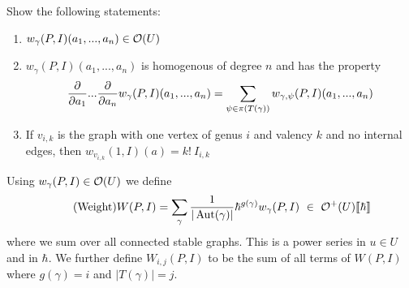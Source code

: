 \begin{ex}
Show the following statements:
\begin{enumerate}
  \item $w_\gamma(P,I)(a_1, ..., a_n) \in \mathcal{O}(U)$

  \item $w_\gamma(P,I)(a_1, ..., a_n)$ is homogenous of degree $n$ and has the property
  \begin{equation}\frac{\partial }{\partial a_1} ... \frac{\partial }{\partial a_n} w_\gamma(P,I)(a_1, ..., a_n) = \sum_{\psi \in \pi(T(\gamma))} w_{\gamma, \psi} (P,I) (a_1, ..., a_n)\end{equation}

  \item If $v_{i,k}$ is the graph with one vertex of genus $i$ and valency $k$ and no internal edges, then $w_{v_{i,k}}(1, I)(a) = k! \ I_{i,k}$
\end{enumerate}
\end{ex}

Using $w_\gamma (P,I) \in \mathcal{O}(U)$ we define
\begin{equation}\label{eq:WPI}\tag{Weight}
  W(P,I) = \sum_\gamma \frac{1}{|\operatorname{Aut}(\gamma)|} \hbar^{g(\gamma)} w_\gamma (P,I) \ \in \ \mathcal{O}^+(U)\llbracket \hbar \rrbracket
\end{equation}
where we sum over all connected stable graphs. This is a power series in $u \in U$ and in $\hbar$. We further define $W_{i,j}(P,I)$ to be the sum of all terms of $W(P,I)$ where $g(\gamma) = i$ and $|T(\gamma)| = j$.

